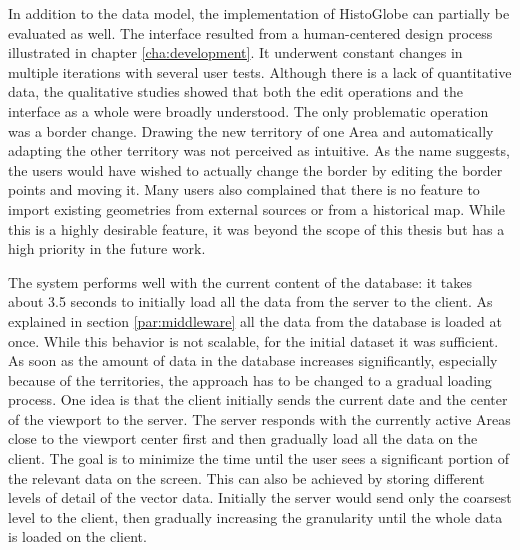 In addition to the data model, the implementation of HistoGlobe can partially be evaluated as well. The interface resulted from a human-centered design process illustrated in chapter \ref{cha:development}. It underwent constant changes in multiple iterations with several user tests. Although there is a lack of quantitative data, the qualitative studies showed that both the edit operations and the interface as a whole were broadly understood. The only problematic operation was a border change. Drawing the new territory of one Area and automatically adapting the other territory was not perceived as intuitive. As the name suggests, the users would have wished to actually change the border by editing the border points and moving it. Many users also complained that there is no feature to import existing geometries from external sources or from a historical map. While this is a highly desirable feature, it was beyond the scope of this thesis but has a high priority in the future work.

The system performs well with the current content of the database: it takes about 3.5 seconds to initially load all the data from the server to the client. As explained in section \ref{par:middleware}  all the data from the database is loaded at once. While this behavior is not scalable, for the initial dataset it was sufficient. As soon as the amount of data in the database increases significantly, especially because of the territories, the approach has to be changed to a gradual loading process. One idea is that the client initially sends the current date and the center of the viewport to the server. The server responds with the currently active Areas close to the viewport center first and then gradually load all the data on the client. The goal is to minimize the time until the user sees a significant portion of the relevant data on the screen. This can also be achieved by storing different levels of detail of the vector data. Initially the server would send only the coarsest level to the client, then gradually increasing the granularity until the whole data is loaded on the client.

